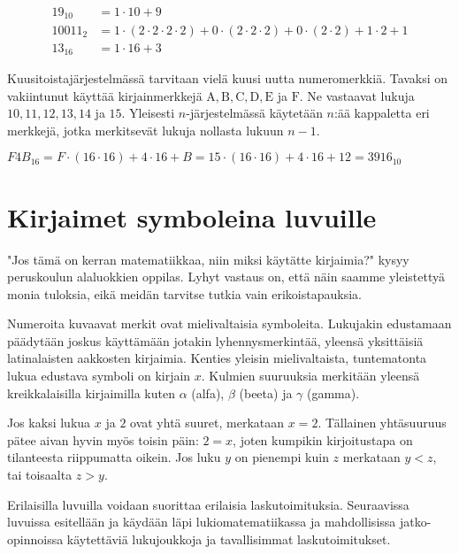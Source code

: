 \begin{esimerkki}
\begin{align*}
19_{10} &= 1 \cdot 10 + 9 \\
10011_{2} &= 1 \cdot (2 \cdot 2 \cdot 2 \cdot 2) + 0 \cdot (2 \cdot 2 \cdot 2) + 0 \cdot (2 \cdot 2) + 1 \cdot 2 + 1 \\
13_{16} &= 1 \cdot 16 + 3
\end{align*}
\end{esimerkki}

Kuusitoistajärjestelmässä tarvitaan vielä kuusi uutta numeromerkkiä. Tavaksi on vakiintunut käyttää kirjainmerkkejä $\mathrm{A, B, C, D, E}$ ja $\mathrm{F}$. Ne vastaavat lukuja $10, 11, 12, 13, 14$ ja $15$. Yleisesti $n$-järjestelmässä käytetään $n$:ää kappaletta eri merkkejä, jotka merkitsevät lukuja nollasta lukuun $n-1$.

\begin{esimerkki}
$F4B_{16} = F \cdot (16 \cdot 16) + 4 \cdot 16 + B = 15 \cdot (16 \cdot 16) + 4 \cdot 16 + 12 = 3916_{10}$
\end{esimerkki}


\section{Kirjaimet symboleina luvuille}

"Jos tämä on kerran matematiikkaa, niin miksi käytätte kirjaimia?" kysyy peruskoulun alaluokkien oppilas. Lyhyt vastaus on, että näin saamme yleistettyä monia tuloksia, eikä meidän tarvitse tutkia vain erikoistapauksia.

Numeroita kuvaavat merkit ovat mielivaltaisia symboleita. Lukujakin edustamaan päädytään joskus käyttämään jotakin lyhennysmerkintää, yleensä yksittäisiä latinalaisten aakkosten kirjaimia. Kenties yleisin mielivaltaista, tuntematonta lukua edustava symboli on kirjain $x$. Kulmien suuruuksia merkitään yleensä kreikkalaisilla kirjaimilla kuten $\alpha$ (alfa), $\beta$ (beeta) ja $\gamma$ (gamma).

Jos kaksi lukua $x$ ja $2$ ovat yhtä suuret, merkataan
$x=2$. Tällainen yhtäsuuruus pätee aivan hyvin myös toisin päin: $2=x$, joten kumpikin kirjoitustapa on tilanteesta riippumatta oikein. Jos luku $y$ on pienempi kuin $z$ merkataan $y<z$, tai toisaalta $z>y$.


Erilaisilla luvuilla voidaan suorittaa erilaisia laskutoimituksia. Seuraavissa luvuissa esitellään ja käydään läpi lukiomatematiikassa ja mahdollisissa jatko-opinnoissa käytettäviä lukujoukkoja ja tavallisimmat laskutoimitukset.
